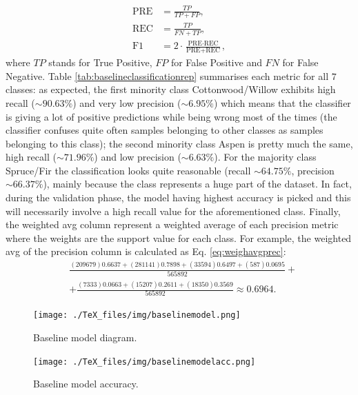 \begin{equation}
\begin{aligned}
\text{PRE} &= \frac{TP}{TP+FP}, \\
\text{REC} &= \frac{TP}{FN+TP}, \\
\text{F1} &= 2 \cdot \frac{\text{PRE} \cdot \text{REC}}{\text{PRE} + \text{REC}},
\end{aligned}
\end{equation}
where $TP$ stands for True Positive, $FP$ for False Positive and $FN$ for False Negative. Table \ref{tab:baselineclassificationrep} summarises each metric for all $7$ classes: as expected, the first minority class Cottonwood/Willow exhibits high recall ($\sim90.63\%$) and very low precision ($\sim6.95\%$) which means that the classifier is giving a lot of positive predictions while being wrong most of the times (the classifier confuses quite often samples belonging to other classes as samples belonging to this class); the second minority class Aspen is pretty much the same, high recall ($\sim71.96\%$) and low precision ($\sim6.63\%$). For the majority class Spruce/Fir the classification looks quite reasonable (recall $\sim64.75\%$, precision $\sim66.37\%$), mainly because the class represents a huge part of the dataset. In fact, during the validation phase, the model having highest accuracy is picked and this will necessarily involve a high recall value for the aforementioned class. Finally, the weighted avg column represent a weighted average of each precision metric where the weights are the support value for each class. For example, the weighted avg of the precision column is calculated as Eq. \ref{eq:weighavgprec}:
\begin{equation}
\label{eq:weighavgprec}
\begin{aligned}
&\frac{(209679)0.6637 + (281141)0.7898 + (33594)0.6497+(587)0.0695}{565892}+ \\
&+\frac{(7333)0.0663 + (15207)0.2611 + (18350)0.3569}{565892} \approx 0.6964.
\end{aligned}
\end{equation}
\begin{figure}
\centering
\texttt{[image: ./TeX\_files/img/baselinemodel.png]}
\caption{Baseline model diagram.}
\label{fig:baselinemodel}
\end{figure}

\begin{figure}
\centering
\texttt{[image: ./TeX\_files/img/baselinemodelacc.png]}
\caption{Baseline model accuracy.}
\label{fig:baselinemodelacc}
\end{figure}


